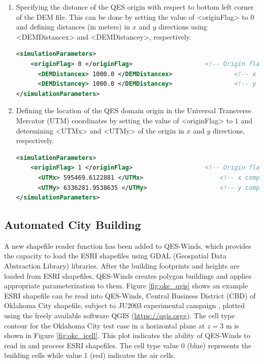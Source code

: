 \begin{enumerate}
\item Specifying the distance of the QES origin with respect to bottom left corner of the DEM file. This can be done by setting the value of <originFlag> to $0$ and defining distances (in meters) in $x$ and $y$ directions using <DEMDistancex> and <DEMDistancey>, respectively.

\begin{lstlisting}[language=XML]
<simulationParameters>
  	<originFlag> 0 </originFlag>					<!-- Origin flag (0- DEM coordinates (default), 1- UTM coordinates) -->
	  <DEMDistancex> 1000.0 </DEMDistancex> 				<!-- x component (m) of origin in DEM coordinates (if originFlag = 0) -->
	  <DEMDistancey> 1000.0 </DEMDistancey> 				<!-- y component (m) of origin in DEM coordinates (if originFlag = 0) -->
</simulationParameters>
\end{lstlisting}

\item Defining the location of the QES domain origin in the Universal Transverse Mercator (UTM) coordinates by setting the value of <originFlag> to $1$ and determining <UTMx> and <UTMy> of the origin in $x$ and $y$ directions, respectively.

\begin{lstlisting}[language=XML]
<simulationParameters>
  	<originFlag> 1 </originFlag>					<!-- Origin flag (0- DEM coordinates (default), 1- UTM coordinates) -->
	  <UTMx> 595469.6122881 </UTMx> 					<!-- x component (m) of origin in UTM DEM coordinates (if originFlag = 1)-->
	  <UTMy> 6336281.9538635 </UTMy> 					<!-- y component (m) of origin in UTM DEM coordinates (if originFlag = 1)-->
</simulationParameters>
\end{lstlisting}

\end{enumerate}

\subsection{Automated City Building}

A new shapefile reader function has been added to QES-Winds, which provides the capacity to load the ESRI shapefiles using GDAL (Geospatial Data Abstraction Library) libraries. After the building footprints and heights are loaded from ESRI shapefiles, QES-Winds creates polygon buildings and applies appropriate parameterization to them. Figure \ref{fig:okc_qgis} shows an example ESRI shapefile can be read into QES-Winds, Central Business District (CBD) of Oklahoma City shapefile, subject to JU2003 experimental campaign \cite{allwine2006joint}, plotted using the freely available software QGIS (\href{https://qgis.org}{https://qgis.orgg}). The cell type contour for the Oklahoma City test case in a horizontal plane at $z=3$ m is shown in Figure \ref{fig:okc_icell}. This plot indicates the ability of QES-Winds to read in and process ESRI shapefiles. The cell type value $0$ (blue) represents the building cells while value $1$ (red) indicates the air cells.

